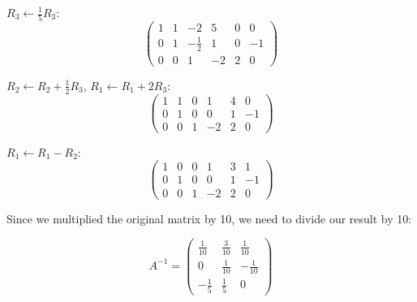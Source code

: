 $R_3 \leftarrow \frac{1}{5}R_3$:
\[
	\left(\begin{array}{ccc|ccc}
			1 & 1 & -2           & 5  & 0 & 0  \\
			0 & 1 & -\frac{1}{2} & 1  & 0 & -1 \\
			0 & 0 & 1            & -2 & 2 & 0
		\end{array}\right)
\]

$R_2 \leftarrow R_2 + \frac{1}{2}R_3$, $R_1 \leftarrow R_1 + 2R_3$:
\[
	\left(\begin{array}{ccc|ccc}
			1 & 1 & 0 & 1  & 4 & 0  \\
			0 & 1 & 0 & 0  & 1 & -1 \\
			0 & 0 & 1 & -2 & 2 & 0
		\end{array}\right)
\]

$R_1 \leftarrow R_1 - R_2$:
\[
	\left(\begin{array}{ccc|ccc}
			1 & 0 & 0 & 1  & 3 & 1  \\
			0 & 1 & 0 & 0  & 1 & -1 \\
			0 & 0 & 1 & -2 & 2 & 0
		\end{array}\right)
\]

Since we multiplied the original matrix by 10, we need to divide our result by 10:

\[
	A^{-1} = \begin{pmatrix}
		\frac{1}{10} & \frac{3}{10} & \frac{1}{10}  \\
		0            & \frac{1}{10} & -\frac{1}{10} \\
		-\frac{1}{5} & \frac{1}{5}  & 0
	\end{pmatrix}
\]